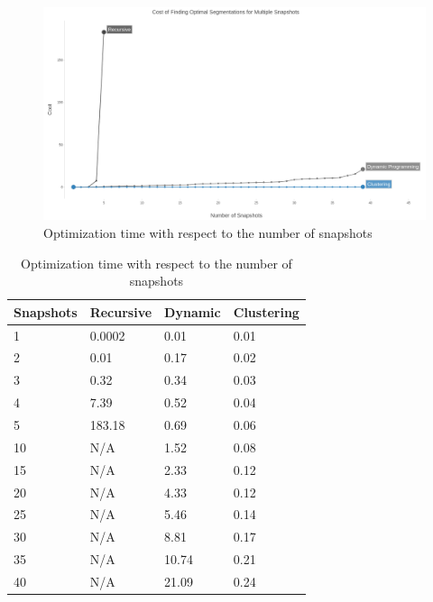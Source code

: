 			\begin{figure}
				\centering
				\includegraphics[width=\textwidth]{figs/variable_snapshots.jpg}
				\caption{Optimization time with respect to the number of snapshots}
				\label{fig:variable_snapshots}
			\end{figure} 

			\begin {center}
			\begin{table}
				\centering
				\caption{Optimization time with respect to the number of snapshots}
				\label {table:variable_snapshots}
				\begin{tabular}{p{2cm}p{3cm}p{3cm}p{3cm}}
					\hline
					Snapshots & Recursive      & Dynamic  & Clustering \\ \hline
					1 & 0.0002    & 0.01  & 0.01  \\  
					2 & 0.01    & 0.17  & 0.02  \\
					3 & 0.32    & 0.34  & 0.03  \\
					4 & 7.39 & 0.52  & 0.04  \\
					5 & 183.18 & 0.69  & 0.06 \\
					10 & N/A    & 1.52  & 0.08  \\
					15 & N/A & 2.33  & 0.12  \\ 
					20 & N/A & 4.33  & 0.12  \\ 
					25 & N/A & 5.46  & 0.14  \\ 
					30 & N/A & 8.81  & 0.17  \\
					35 & N/A & 10.74  & 0.21  \\
					40 & N/A & 21.09  & 0.24  \\\hline
				\end{tabular}
			\end{table}
			\end{center}

